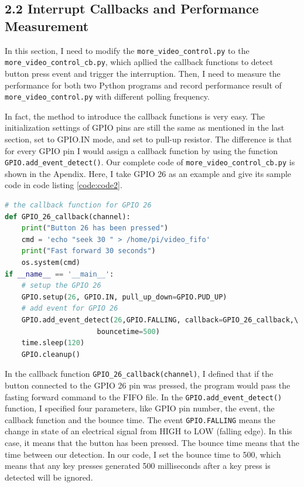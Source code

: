 \documentclass[12pt]{report}
\newcommand{\code}[1]{\colorbox{light-gray}{\texttt{#1}}}
\begin{document}
\subsection*{2.2 Interrupt Callbacks and Performance Measurement}\vspace{-1em}
In this section, I need to modify the  \code{more\_video\_control.py} to the  \code{more\_video\_control\_cb.py}, which apllied the callback functions to detect button press event and trigger the interruption. Then, I need to measure the performance for both two Python programs and record performance result of \code{more\_video\_control.py} with different polling frequency.\par
In fact, the method to introduce the callback functions is very easy. The initialization settings of GPIO pins are still the same as mentioned in the last section, set to GPIO.IN mode, and set to pull-up resistor. The difference is that for every GPIO pin I would assign a callback function by using the function \code{GPIO.add\_event\_detect()}. Our complete code of \code{more\_video\_control\_cb.py} is shown in the Apendix. Here, I take GPIO 26 as an example and give its sample code in code listing \ref{code:code2}.\par 
\begin{center}
\begin{lstlisting}[language=Python, caption=Sample code for GPIO 26, label=code:code2]
# the callback function for GPIO 26
def GPIO_26_callback(channel):
    print("Button 26 has been pressed") 
    cmd = 'echo "seek 30 " > /home/pi/video_fifo'
    print("Fast forward 30 seconds")
    os.system(cmd)
if __name__ == '__main__':
    # setup the GPIO 26
    GPIO.setup(26, GPIO.IN, pull_up_down=GPIO.PUD_UP)
    # add event for GPIO 26
    GPIO.add_event_detect(26,GPIO.FALLING, callback=GPIO_26_callback,\ 
                      bouncetime=500)
    time.sleep(120)
    GPIO.cleanup()
\end{lstlisting}
\end{center}\vspace{-2em}
In the callback function \code{GPIO\_26\_callback(channel)}, I defined that if the button connected to the GPIO 26 pin was pressed, the program would pass the fasting forward command to the FIFO file. In the \code{GPIO.add\_event\_detect()} function, I specified four parameters, like GPIO pin number, the event, the callback function and the bounce time. The event \code{GPIO.FALLING} means the change in state of an electrical signal from HIGH to LOW (falling edge). In this case, it means that the button has been pressed. The bounce time means that the time between our detection. In our code, I set the bounce time to 500, which means that any key presses generated 500 milliseconds after a key press is detected will be ignored.\par
\end{document}
